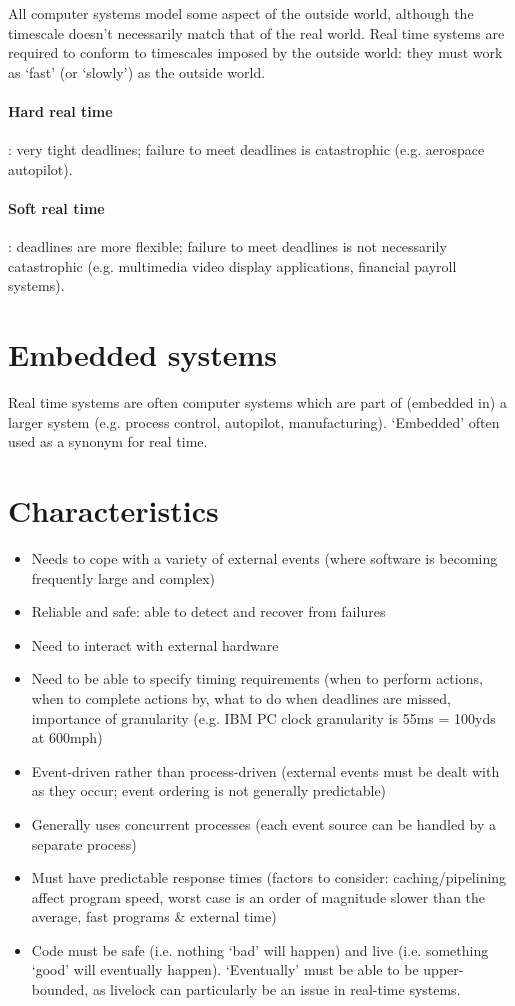 \documentclass[a4paper,oneside]{report}
\begin{document}
  	All computer systems model some aspect of the outside world, although the timescale doesn't necessarily match that of the real world. Real time systems are required to conform to timescales imposed by the outside world: they must work as `fast' (or `slowly') as the outside world.
  	
  	\paragraph{Hard real time}: very tight deadlines; failure to meet deadlines is catastrophic (e.g. aerospace autopilot).
  	
  	\paragraph{Soft real time}: deadlines are more flexible; failure to meet deadlines is not necessarily catastrophic (e.g. multimedia video display applications, financial payroll systems).
  
  	
  	\section{Embedded systems}
  	Real time systems are often computer systems which are part of (embedded in) a larger system (e.g. process control, autopilot, manufacturing). ‘Embedded’ often used as a synonym for real time.
  	
  	\section{Characteristics}
  	
  	\begin{itemize}
  		\item Needs to cope with a variety of external events (where software is becoming frequently large and complex)
		\item Reliable and safe: able to detect and recover from failures
		\item Need to interact with external hardware
  		\item Need to be able to specify timing requirements (when to perform actions, when to complete actions by, what to do when deadlines are missed, importance of granularity (e.g. IBM PC clock granularity is 55ms = 100yds at 600mph)
  		\item Event-driven rather than process-driven (external events must be dealt with as they occur; event ordering is not generally predictable)
		\item Generally uses concurrent processes (each event source can be handled by a separate process)  
  		\item Must have predictable response times (factors to consider: caching/pipelining affect program speed, worst case is an order of magnitude slower than the average, fast programs \& external time)
  		\item Code must be safe (i.e. nothing `bad' will happen) and live (i.e. something `good' will eventually happen). `Eventually' must be able to be upper-bounded, as livelock can particularly be an issue in real-time systems.
  	\end{itemize}
  	
\end{document}
